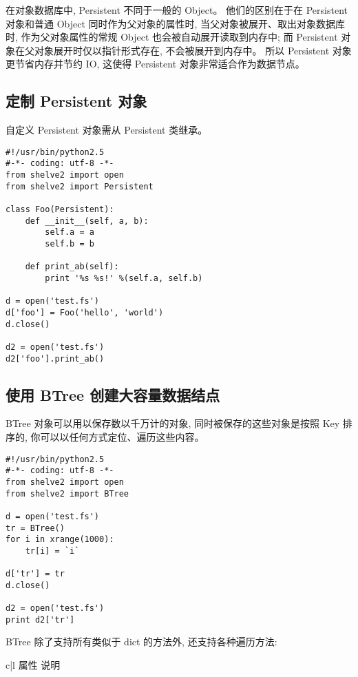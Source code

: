 \documentclass{manual}
\begin{document}
在对象数据库中, Persistent 不同于一般的 Object。
他们的区别在于在 Persistent 对象和普通 Object 同时作为父对象的属性时,
当父对象被展开、取出对象数据库时, 作为父对象属性的常规 Object 也会被自动展开读取到内存中;
而 Persistent 对象在父对象展开时仅以指针形式存在, 不会被展开到内存中。
所以 Persistent 对象更节省内存并节约 IO, 这使得 Persistent 对象非常适合作为数据节点。

\subsection{定制 Persistent 对象}

自定义 Persistent 对象需从 Persistent 类继承。

\begin{verbatim}
#!/usr/bin/python2.5
#-*- coding: utf-8 -*-
from shelve2 import open
from shelve2 import Persistent

class Foo(Persistent):
	def __init__(self, a, b):
		self.a = a
		self.b = b

	def print_ab(self):
		print '%s %s!' %(self.a, self.b)

d = open('test.fs')
d['foo'] = Foo('hello', 'world')
d.close()

d2 = open('test.fs')
d2['foo'].print_ab()
\end{verbatim}

\subsection{使用 BTree 创建大容量数据结点}

BTree 对象可以用以保存数以千万计的对象, 同时被保存的这些对象是按照 Key 排序的, 你可以以任何方式定位、遍历这些内容。

\begin{verbatim}
#!/usr/bin/python2.5
#-*- coding: utf-8 -*-
from shelve2 import open
from shelve2 import BTree

d = open('test.fs')
tr = BTree()
for i in xrange(1000):
	tr[i] = `i`

d['tr'] = tr
d.close()

d2 = open('test.fs')
print d2['tr']
\end{verbatim}

BTree 除了支持所有类似于 dict 的方法外, 还支持各种遍历方法:

\begin{tableii}{c|l}{}{ 属性 }{ 说明 }
\end{tableii}
\end{document}
